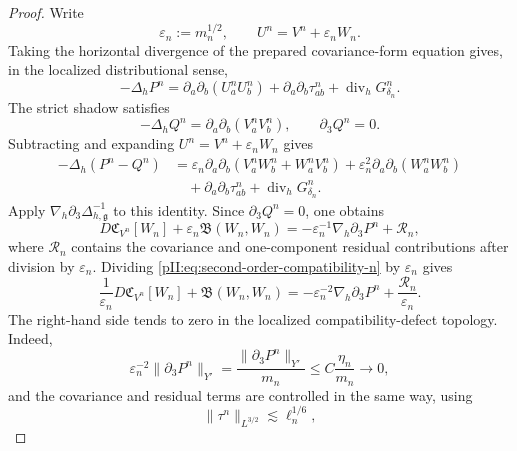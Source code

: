 \documentclass[11pt]{article}
\numberwithin{equation}{section}
\theoremstyle{plain}
\theoremstyle{definition}
\theoremstyle{remark}
\begin{document}
\begin{proof}
Write
\[
        \varepsilon_n:=m_n^{1/2},
        \qquad
        U^n=V^n+\varepsilon_nW_n.
\]
Taking the horizontal divergence of the prepared covariance-form equation gives, in the localized distributional sense,
\begin{equation}\label{pII:eq:prepared-pressure-divergence}
        -\Delta_hP^n
        =\partial_a\partial_b(U_a^nU_b^n)
        +\partial_a\partial_b\tau^n_{ab}
        +\operatorname{div}_hG^n_{\delta_n}.
\end{equation}
The strict shadow satisfies
\begin{equation}\label{pII:eq:strict-shadow-pressure-divergence}
        -\Delta_hQ^n
        =\partial_a\partial_b(V_a^nV_b^n),
        \qquad
        \partial_3Q^n=0.
\end{equation}
Subtracting and expanding $U^n=V^n+\varepsilon_nW_n$ gives
\[
\begin{aligned}
        -\Delta_h(P^n-Q^n)
        &=\varepsilon_n\partial_a\partial_b(V_a^nW_b^n+W_a^nV_b^n)
          +\varepsilon_n^2\partial_a\partial_b(W_a^nW_b^n)  \\
        &\quad +\partial_a\partial_b\tau^n_{ab}
          +\operatorname{div}_hG^n_{\delta_n}.
\end{aligned}
\]
Apply $\nabla_h\partial_3\Delta_{h,\mathfrak g}^{-1}$ to this identity.  Since $\partial_3Q^n=0$, one obtains
\begin{equation}\label{pII:eq:second-order-compatibility-n}
        D\mathfrak C_{V^n}[W_n]
        +\varepsilon_n\mathfrak B(W_n,W_n)
        =-\varepsilon_n^{-1}\nabla_h\partial_3P^n
        +\mathcal R_n,
\end{equation}
where $\mathcal R_n$ contains the covariance and one-component residual contributions after division by $\varepsilon_n$.
Dividing \eqref{pII:eq:second-order-compatibility-n} by $\varepsilon_n$ gives
\begin{equation}\label{pII:eq:second-order-compatibility-divided}
        \frac1{\varepsilon_n}D\mathfrak C_{V^n}[W_n]
        +\mathfrak B(W_n,W_n)
        =-\varepsilon_n^{-2}\nabla_h\partial_3P^n
        +\frac{\mathcal R_n}{\varepsilon_n}.
\end{equation}
The right-hand side tends to zero in the localized compatibility-defect topology.  Indeed,
\[
        \varepsilon_n^{-2}\|\partial_3P^n\|_{Y'}
        =\frac{\|\partial_3P^n\|_{Y'}}{m_n}
        \le C\frac{\eta_n}{m_n}\to0,
\]
and the covariance and residual terms are controlled in the same way, using
\[
        \|\tau^n\|_{L^{3/2}}\lesssim \ell_n^{1/6},
\]
\end{proof}
\end{document}
